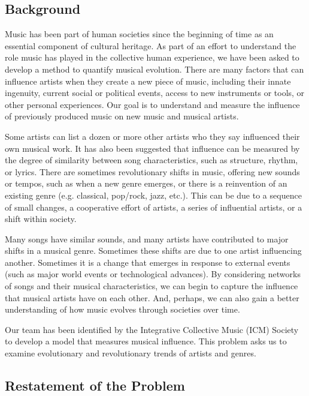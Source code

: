 \documentclass[UTF-8]{article}
\begin{document}
 \subsection{Background}
 Music has been part of human societies since the beginning of time as an essential component of
 cultural heritage. As part of an effort to understand the role music has played in the collective
 human experience, we have been asked to develop a method to quantify musical evolution. There
 are many factors that can influence artists when they create a new piece of music, including their
 innate ingenuity, current social or political events, access to new instruments or tools, or other
 personal experiences. Our goal is to understand and measure the influence of previously
 produced music on new music and musical artists.\par
 Some artists can list a dozen or more other artists who they say influenced their own musical
 work. It has also been suggested that influence can be measured by the degree of similarity
 between song characteristics, such as structure, rhythm, or lyrics. There are sometimes
 revolutionary shifts in music, offering new sounds or tempos, such as when a new genre
 emerges, or there is a reinvention of an existing genre (e.g. classical, pop/rock, jazz, etc.). This
 can be due to a sequence of small changes, a cooperative effort of artists, a series of influential
 artists, or a shift within society.\par
 Many songs have similar sounds, and many artists have contributed to major shifts in a musical
 genre. Sometimes these shifts are due to one artist influencing another. Sometimes it is a change
 that emerges in response to external events (such as major world events or technological
 advances). By considering networks of songs and their musical characteristics, we can begin to
 capture the influence that musical artists have on each other. And, perhaps, we can also gain a
 better understanding of how music evolves through societies over time.\par
 Our team has been identified by the Integrative Collective Music (ICM) Society to develop a
 model that measures musical influence. This problem asks us to examine evolutionary and
 revolutionary trends of artists and genres.
   \subsection{Restatement of the Problem}
\end{document}
